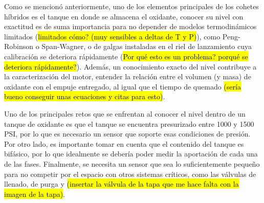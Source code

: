 


Como se mencionó anteriormente, uno de los elementos principales de los cohetes híbridos es el tanque en donde se almacena el oxidante, conocer su nivel con exactitud es de suma importancia para no depender de modelos termodinámicos limitados (\hl{limitados cómo? (muy sensibles a deltas de T y P)}), como Peng-Robinson\cite{peng_robinson_model} o Span-Wagner\cite{span_wagner_nonpolar_model}, o de galgas instaladas en el riel de lanzamiento cuya calibración se deteriora rápidamente (\hl{Por qué esto es un problema? porqué se deteriora rápidamente?}). Además, un conocimiento exacto del nivel contribuye a la caracterización del motor, entender la relación entre el volumen (y masa) de oxidante con el empuje entregado, al igual que el tiempo de quemado \hl{(sería bueno conseguir unas ecuaciones y citas para esto)}.

Uno de los principales retos que se enfrentan al conocer el nivel dentro de un tanque de oxidante es que el tanque se encuentra presurizado entre 1000 y 1500 PSI, por lo que es necesario un sensor que soporte esas condiciones de presión. Por otro lado, es importante tomar en cuenta que el contenido del tanque es bifásico, por lo que idealmente se debería poder medir la aportación de cada una de las fases. Finalmente, se necesita un sensor que sea lo suficientemente pequeño para no competir por el espacio con otros sistemas críticos, como las válvulas de llenado, de purga y \hl{(insertar la válvula de la tapa que me hace falta con la imagen de la tapa)}.























